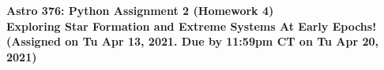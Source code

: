 \documentclass[11pt]{article}    %
\begin{document}
%
\setcounter{page}{0}
\setcounter{section}{0}

\begin{center}
\Large
{\bf Astro 376: Python Assignment 2 (Homework 4)\\
Exploring Star Formation and Extreme Systems At Early Epochs!}\\
\vspace{4 mm}
\large
{\bf (Assigned on Tu Apr 13, 2021. Due by 11:59pm CT on Tu Apr 20, 2021)}

\end{center}
\end{document}
